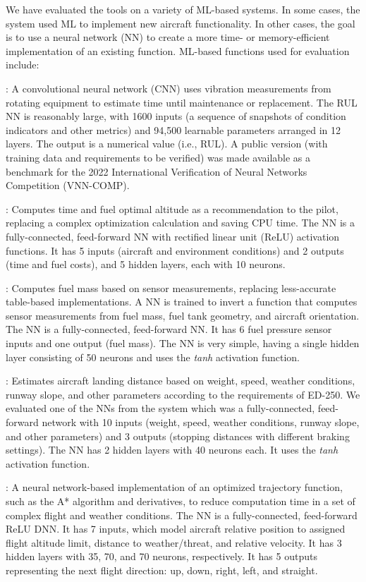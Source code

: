 We have evaluated the tools on a variety of ML-based systems.  In some cases, the system used ML to implement new aircraft functionality.  In other cases, the goal is to use a neural network (NN) to create a more time- or memory-efficient implementation of an existing function.  ML-based functions used for evaluation include:

:  A convolutional neural network (CNN) uses vibration measurements from rotating equipment to estimate time until maintenance or replacement.  The RUL NN is reasonably large, with 1600 inputs (a sequence of snapshots of condition indicators and other metrics) and 94,500 learnable parameters arranged in 12 layers. The output is a numerical value (i.e., RUL). A public version (with training data and requirements to be verified) was made available as a benchmark for the 2022 International Verification of Neural Networks Competition (VNN-COMP).


:  Computes time and fuel optimal altitude as a recommendation to the pilot, replacing a complex optimization calculation and saving CPU time. The NN is a fully-connected, feed-forward NN with rectified linear unit (ReLU) activation functions. It has 5 inputs (aircraft and environment conditions) and 2 outputs (time and fuel costs), and 5 hidden layers, each with 10 neurons.


:  Computes fuel mass based on sensor measurements, replacing less-accurate table-based implementations.  A NN is trained to invert a function that computes sensor measurements from fuel mass, fuel tank geometry, and aircraft orientation.  The NN is a fully-connected, feed-forward NN. It has 6 fuel pressure sensor inputs and one output (fuel mass). The NN is very simple, having a single hidden layer consisting of 50 neurons and uses the \emph{tanh} activation function. 


:  Estimates aircraft landing distance based on weight, speed, weather conditions, runway slope, and other parameters according to the requirements of ED-250.  We evaluated one of the NNs from the system which was a fully-connected, feed-forward network with 10 inputs (weight, speed, weather conditions, runway slope, and other parameters) and 3 outputs (stopping distances with different braking settings). The NN has 2 hidden layers with 40 neurons each. It uses the \emph{tanh} activation function. 

: A neural network-based implementation of an optimized trajectory function, such as the A* algorithm and derivatives, to reduce computation time in a set of complex flight and weather conditions. The NN is a fully-connected, feed-forward ReLU DNN. It has 7 inputs, which model aircraft relative position to assigned flight altitude limit, distance to weather/threat, and relative velocity. It has 3 hidden layers with 35, 70, and 70 neurons, respectively. It has 5 outputs representing the next flight direction: up, down, right, left, and straight.


